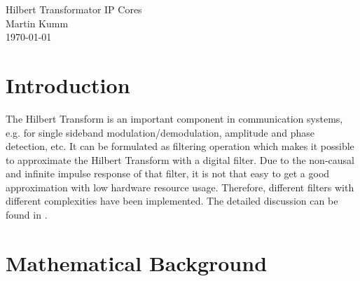\documentclass[a4paper,BCOR7mm,12pt,pointlessnumbers,bibtotoc]{scrartcl}
\begin{document}
\begin{center}
\Large Hilbert Transformator IP Cores\\[0.4cm]
\large Martin Kumm \\[0.5cm]
\large \today \\[0.5cm]
\end{center}

\section{Introduction}

The Hilbert Transform is an important component in communication systems, e.g. for single sideband modulation/demodulation, amplitude and phase detection, etc. It can be formulated as filtering operation which makes it possible to approximate the Hilbert Transform with a digital filter. Due to the non-causal and infinite impulse response of that filter, it is not that easy to get a good approximation with low hardware resource usage. Therefore, different filters with different complexities have been implemented. The detailed discussion can be found in \cite{ks08}. 

\section{Mathematical Background}
\end{document}
